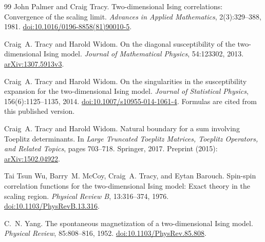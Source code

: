 \documentclass[11pt]{article}
\numberwithin{equation}{section}
\theoremstyle{definition}
\begin{document}
\begin{thebibliography}{99}
John Palmer and Craig Tracy.
\newblock Two-dimensional {Ising} correlations: Convergence of the scaling limit.
\newblock \emph{Advances in Applied Mathematics}, 2(3):329--388, 1981.
\newblock \href{https://doi.org/10.1016/0196-8858(81)90010-5}{doi:10.1016/0196-8858(81)90010-5}.

Craig~A. Tracy and Harold Widom.
\newblock On the diagonal susceptibility of the two-dimensional {Ising} model.
\newblock \emph{Journal of Mathematical Physics}, 54:123302, 2013.
\newblock \href{https://arxiv.org/abs/1307.5913v3}{arXiv:1307.5913v3}.

Craig~A. Tracy and Harold Widom.
\newblock On the singularities in the susceptibility expansion for the
two-dimensional {Ising} model.
\newblock \emph{Journal of Statistical Physics}, 156(6):1125--1135, 2014.
\newblock \href{https://doi.org/10.1007/s10955-014-1061-4}{doi:10.1007/s10955-014-1061-4}.
\newblock Formulas are cited from this published version.

Craig~A. Tracy and Harold Widom.
\newblock Natural boundary for a sum involving {Toeplitz} determinants.
\newblock In \emph{Large Truncated Toeplitz Matrices, Toeplitz Operators,
and Related Topics}, pages 703--718. Springer, 2017.
\newblock Preprint (2015):
\href{https://arxiv.org/abs/1502.04922}{arXiv:1502.04922}.

Tai Tsun Wu, Barry~M. McCoy, Craig~A. Tracy, and Eytan Barouch.
\newblock Spin-spin correlation functions for the two-dimensional {Ising}
model: Exact theory in the scaling region.
\newblock \emph{Physical Review B}, 13:316--374, 1976.
\newblock \href{https://doi.org/10.1103/PhysRevB.13.316}{doi:10.1103/PhysRevB.13.316}.

C.~N. Yang.
\newblock The spontaneous magnetization of a two-dimensional {Ising} model.
\newblock \emph{Physical Review}, 85:808--816, 1952.
\newblock \href{https://doi.org/10.1103/PhysRev.85.808}{doi:10.1103/PhysRev.85.808}.

\end{thebibliography}
\end{document}
